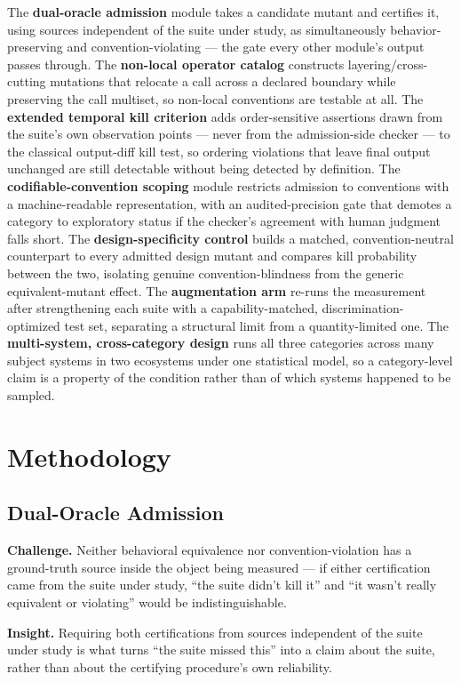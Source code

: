 \documentclass[11pt]{article}
\begin{document}
The \textbf{dual-oracle admission} module takes a candidate mutant and certifies it, using sources independent of the suite under study, as simultaneously behavior-preserving and convention-violating --- the gate every other module's output passes through. The \textbf{non-local operator catalog} constructs layering/cross-cutting mutations that relocate a call across a declared boundary while preserving the call multiset, so non-local conventions are testable at all. The \textbf{extended temporal kill criterion} adds order-sensitive assertions drawn from the suite's own observation points --- never from the admission-side checker --- to the classical output-diff kill test, so ordering violations that leave final output unchanged are still detectable without being detected by definition. The \textbf{codifiable-convention scoping} module restricts admission to conventions with a machine-readable representation, with an audited-precision gate that demotes a category to exploratory status if the checker's agreement with human judgment falls short. The \textbf{design-specificity control} builds a matched, convention-neutral counterpart to every admitted design mutant and compares kill probability between the two, isolating genuine convention-blindness from the generic equivalent-mutant effect. The \textbf{augmentation arm} re-runs the measurement after strengthening each suite with a capability-matched, discrimination-optimized test set, separating a structural limit from a quantity-limited one. The \textbf{multi-system, cross-category design} runs all three categories across many subject systems in two ecosystems under one statistical model, so a category-level claim is a property of the condition rather than of which systems happened to be sampled.

\section{Methodology}

\subsection{Dual-Oracle Admission}
\textbf{Challenge.} Neither behavioral equivalence nor convention-violation has a ground-truth source inside the object being measured --- if either certification came from the suite under study, ``the suite didn't kill it'' and ``it wasn't really equivalent or violating'' would be indistinguishable.

\textbf{Insight.} Requiring both certifications from sources independent of the suite under study is what turns ``the suite missed this'' into a claim about the suite, rather than about the certifying procedure's own reliability.
\end{document}
